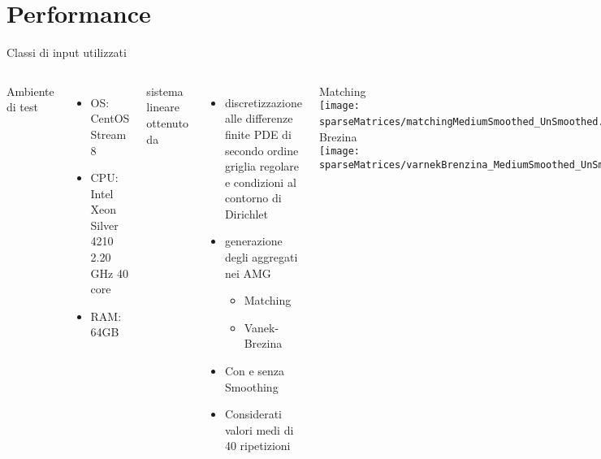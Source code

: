 \section{Performance}
\begin{frame} {Classi di input utilizzati}
\begin{columns}
	Ambiente di test
	\begin{itemize}
		\item	OS: CentOS Stream 8
		\item	CPU: Intel Xeon Silver 4210 2.20 GHz 40 core
		\item	RAM: 64GB
	\end{itemize}
	\voidLine
	sistema lineare ottenuto da 
	\begin{itemize}
		\item	discretizzazione alle differenze finite PDE di secondo ordine
		griglia regolare e condizioni al contorno di Dirichlet
		\item	generazione degli aggregati nei AMG
		\begin{itemize}
			\item	Matching
			\item	Vanek-Brezina
		\end{itemize}
		\item	Con e senza Smoothing
		\item	Considerati valori medi di 40 ripetizioni
	\end{itemize}
	Matching\\
	\texttt{[image: sparseMatrices/matchingMediumSmoothed\_UnSmoothed.ppm.png]}
	Vanek-Brezina\\
	\texttt{[image: sparseMatrices/varnekBrenzina\_MediumSmoothed\_UnSmoothed.ppm.png]}
\end{columns}
\end{frame}

